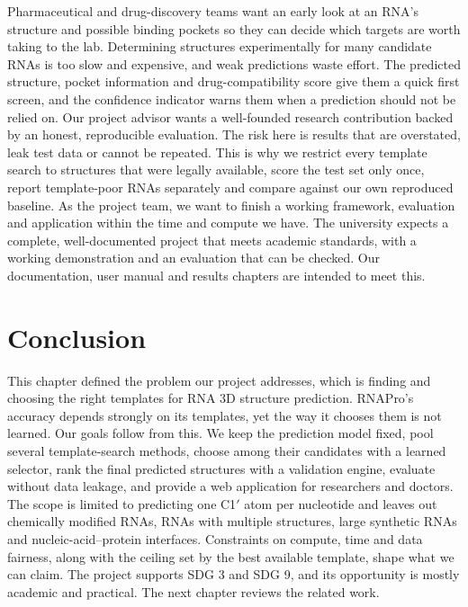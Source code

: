 \documentclass{FastFyp}
\begin{document}
Pharmaceutical and drug-discovery teams want an early look at an RNA's structure and possible binding pockets so they can decide which targets are worth taking to the lab. Determining structures experimentally for many candidate RNAs is too slow and expensive, and weak predictions waste effort. The predicted structure, pocket information and drug-compatibility score give them a quick first screen, and the confidence indicator warns them when a prediction should not be relied on. Our project advisor wants a well-founded research contribution backed by an honest, reproducible evaluation. The risk here is results that are overstated, leak test data or cannot be repeated. This is why we restrict every template search to structures that were legally available, score the test set only once, report template-poor RNAs separately and compare against our own reproduced baseline. As the project team, we want to finish a working framework, evaluation and application within the time and compute we have. The university expects a complete, well-documented project that meets academic standards, with a working demonstration and an evaluation that can be checked. Our documentation, user manual and results chapters are intended to meet this.

\section{Conclusion}
This chapter defined the problem our project addresses, which is finding and choosing the right templates for RNA 3D structure prediction. RNAPro's accuracy depends strongly on its templates, yet the way it chooses them is not learned. Our goals follow from this. We keep the prediction model fixed, pool several template-search methods, choose among their candidates with a learned selector, rank the final predicted structures with a validation engine, evaluate without data leakage, and provide a web application for researchers and doctors. The scope is limited to predicting one C1$'$ atom per nucleotide and leaves out chemically modified RNAs, RNAs with multiple structures, large synthetic RNAs and nucleic-acid--protein interfaces. Constraints on compute, time and data fairness, along with the ceiling set by the best available template, shape what we can claim. The project supports SDG 3 and SDG 9, and its opportunity is mostly academic and practical. The next chapter reviews the related work.

\clearpage
\end{document}
